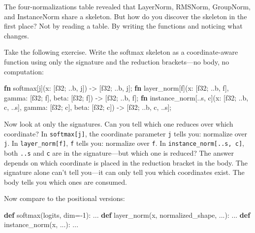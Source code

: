 \documentclass[11pt,titlepage]{article}
\newenvironment{Shaded}{}{}
\newcommand{\DataTypeTok}[1]{\textcolor[rgb]{0.56,0.13,0.00}{#1}}
\newcommand{\DecValTok}[1]{\textcolor[rgb]{0.25,0.63,0.44}{#1}}
\newcommand{\KeywordTok}[1]{\textcolor[rgb]{0.00,0.44,0.13}{\textbf{#1}}}
\newcommand{\NormalTok}[1]{#1}
\newcommand{\OperatorTok}[1]{\textcolor[rgb]{0.40,0.40,0.40}{#1}}
\begin{document}
The four-normalizations table revealed that LayerNorm, RMSNorm,
GroupNorm, and InstanceNorm share a skeleton. But how do you discover
the skeleton in the first place? Not by reading a table. By writing the
functions and noticing what changes.

Take the following exercise. Write the softmax skeleton as a
coordinate-aware function using only the signature and the reduction
brackets---no body, no computation:

\begin{Shaded}
\begin{Highlighting}[]
\KeywordTok{fn}\NormalTok{ softmax[j](x: }\OperatorTok{[}\DataTypeTok{f32}\NormalTok{; ..b, j}\OperatorTok{]}\NormalTok{) -> }\OperatorTok{[}\DataTypeTok{f32}\NormalTok{; ..b, j}\OperatorTok{]}\NormalTok{;}
\KeywordTok{fn}\NormalTok{ layer_norm[f](x: }\OperatorTok{[}\DataTypeTok{f32}\NormalTok{; ..b, f}\OperatorTok{]}\NormalTok{, gamma: }\OperatorTok{[}\DataTypeTok{f32}\NormalTok{; f}\OperatorTok{]}\NormalTok{, beta: }\OperatorTok{[}\DataTypeTok{f32}\NormalTok{; f}\OperatorTok{]}\NormalTok{) -> }\OperatorTok{[}\DataTypeTok{f32}\NormalTok{; ..b, f}\OperatorTok{]}\NormalTok{;}
\KeywordTok{fn}\NormalTok{ instance_norm[..s, c](x: }\OperatorTok{[}\DataTypeTok{f32}\NormalTok{; ..b, c, ..s}\OperatorTok{]}\NormalTok{, gamma: }\OperatorTok{[}\DataTypeTok{f32}\NormalTok{; c}\OperatorTok{]}\NormalTok{, beta: }\OperatorTok{[}\DataTypeTok{f32}\NormalTok{; c}\OperatorTok{]}\NormalTok{) -> }\OperatorTok{[}\DataTypeTok{f32}\NormalTok{; ..b, c, ..s}\OperatorTok{]}\NormalTok{;}
\end{Highlighting}
\end{Shaded}

Now look at only the signatures. Can you tell which one reduces over
which coordinate? In \texttt{softmax{[}j{]}}, the coordinate parameter
\texttt{j} tells you: normalize over \texttt{j}. In
\texttt{layer\_norm{[}f{]}}, \texttt{f} tells you: normalize over
\texttt{f}. In \texttt{instance\_norm{[}..s,\ c{]}}, both \texttt{..s}
and \texttt{c} are in the signature---but which one is reduced? The
answer depends on which coordinate is placed in the reduction bracket in
the body. The signature alone can't tell you---it can only tell you
which coordinates exist. The body tells you which ones are consumed.

Now compare to the positional versions:

\begin{Shaded}
\begin{Highlighting}[]
\KeywordTok{def}\NormalTok{ softmax(logits, dim}\OperatorTok{=-}\DecValTok{1}\NormalTok{): ...}
\KeywordTok{def}\NormalTok{ layer_norm(x, normalized_shape, ...): ...}
\KeywordTok{def}\NormalTok{ instance_norm(x, ...): ...}
\end{Highlighting}
\end{Shaded}
\end{document}
